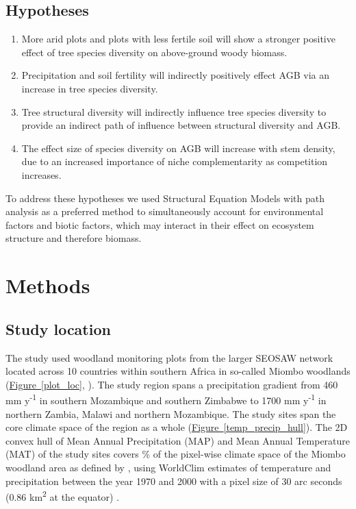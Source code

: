 \documentclass[11pt,a4paper]{article}
\begin{document}
\subsection{Hypotheses}

\begin{enumerate}
	\item{More arid plots and plots with less fertile soil will show a stronger positive effect of tree species diversity on above-ground woody biomass.} 
	\item{Precipitation and soil fertility will indirectly positively effect AGB via an increase in tree species diversity.}
	\item{Tree structural diversity will indirectly influence tree species diversity to provide an indirect path of influence between structural diversity and AGB.}
	\item{The effect size of species diversity on AGB will increase with stem density, due to an increased importance of niche complementarity as competition increases.}
\end{enumerate}

To address these hypotheses we used Structural Equation Models with path analysis as a preferred method to simultaneously account for environmental factors and biotic factors, which may interact in their effect on ecosystem structure and therefore biomass.

\section{Methods}

\subsection{Study location}

The study used \nplots{} woodland monitoring plots from the larger SEOSAW network \citep{seosaw_web} located across 10 countries within southern Africa in so-called Miombo woodlands (\hyperref[plot_loc]{Figure~\ref*{plot_loc}}, \citealt{White1987}). The study region spans a precipitation gradient from \textapprox{}460 mm y\textsuperscript{-1} in southern Mozambique and southern Zimbabwe to \textapprox{}1700 mm y\textsuperscript{-1} in northern Zambia, Malawi and northern Mozambique. The study sites span the core climate space of the region as a whole (\hyperref[temp_precip_hull]{Figure~\ref*{temp_precip_hull}}). The 2D convex hull of Mean Annual Precipitation (MAP) and Mean Annual Temperature (MAT) of the study sites covers \hullcover{}\% of the pixel-wise climate space of the Miombo woodland area as defined by \citet{White1987}, using WorldClim estimates of temperature and precipitation between the year 1970 and 2000 with a pixel size of 30 arc seconds (0.86 km\textsuperscript{2} at the equator) \citep{Fick2017}. 
\end{document}
